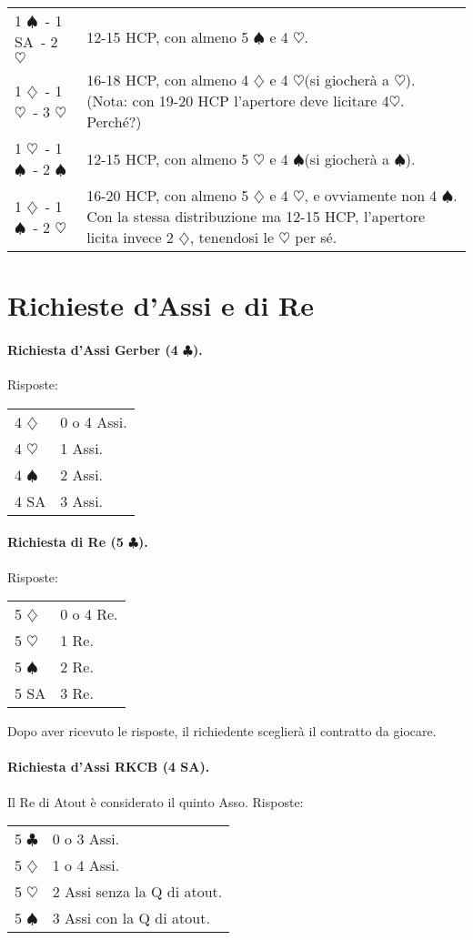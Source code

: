 \documentclass[a4paper,10pt]{article}
\renewcommand{\c}{$\clubsuit$\xspace}
\renewcommand{\d}{$\diamondsuit$\xspace}
\newcommand{\h}{$\heartsuit$\xspace}
\newcommand{\s}{$\spadesuit$\xspace}
\newcommand{\sa}{SA\xspace}
\newcommand{\smallspace}{\vskip0.3cm}
\newenvironment{twocol}
  {\smallspace\noindent\begin{tabular}{l p{0.78\textwidth}}}
  {\end{tabular}\smallspace}
\begin{document}
\begin{twocol}
1 \s\ - 1 \sa\ - 2 \h & 12-15 HCP, con almeno 5 \s e 4 \h.\\
1 \d\ - 1 \h\ - 3 \h & 16-18 HCP, con almeno 4 \d e 4 \h (si giocherà a \h). (Nota: con 19-20 HCP l'apertore deve licitare 4\h. Perché?)\\
1 \h\ - 1 \s\ - 2 \s & 12-15 HCP, con almeno 5 \h e 4 \s (si giocherà a \s).\\
1 \d\ - 1 \s\ - 2 \h & 16-20 HCP, con almeno 5 \d e 4 \h, e ovviamente non 4 \s. Con la stessa distribuzione ma 12-15 HCP, l'apertore licita invece 2 \d, tenendosi le \h per sé.
\end{twocol}


\section{Richieste d'Assi e di Re}

\paragraph{Richiesta d'Assi Gerber (4 \c).} Risposte:

\begin{twocol}
4 \d & 0 o 4 Assi.\\
4 \h & 1 Assi.\\
4 \s & 2 Assi.\\
4 \sa & 3 Assi.
\end{twocol}

\paragraph{Richiesta di Re (5 \c).} Risposte:

\begin{twocol}
5 \d & 0 o 4 Re.\\
5 \h & 1 Re.\\
5 \s & 2 Re.\\
5 \sa & 3 Re.
\end{twocol}

Dopo aver ricevuto le risposte, il richiedente sceglierà il contratto da giocare.

\paragraph{Richiesta d'Assi RKCB (4 \sa).} Il Re di Atout è considerato il quinto Asso. Risposte:

\begin{twocol}
5 \c & 0 o 3 Assi.\\
5 \d & 1 o 4 Assi.\\
5 \h & 2 Assi senza la Q di atout.\\
5 \s & 3 Assi con la Q di atout.
\end{twocol}
\end{document}
